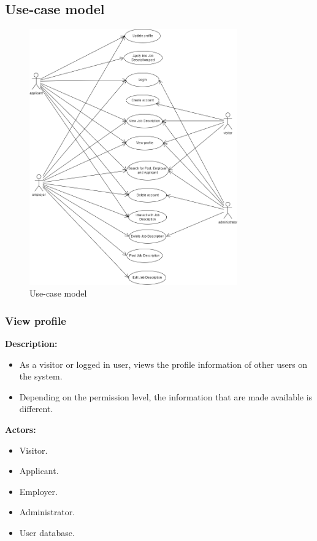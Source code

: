 \documentclass[a4paper]{article}
\begin{document}
\pagebreak
\subsection{Use-case model}

\begin{figure}[H]
    \centering
    \includegraphics[width=0.8\textwidth]{usecase_model.drawio.png}
    \caption{Use-case model}
    \label{fig:fig1}
\end{figure}

\subsubsection{View profile}
\textbf{Description:}
\begin{itemize}
    \item As a visitor or logged in user, views the profile information of other users on the system.
    \item Depending on the permission level, the information that are made available is different.
\end{itemize}

\textbf{Actors:}
\begin{itemize}
    \item Visitor.
    \item Applicant.
    \item Employer.
    \item Administrator.
    \item User database.
\end{itemize}
\end{document}
